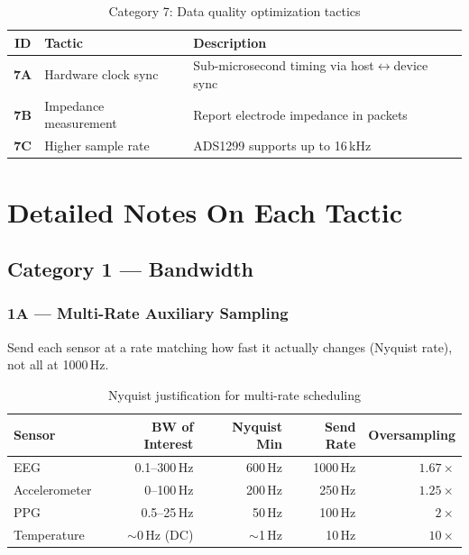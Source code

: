 \documentclass[11pt,a4paper]{article}
\newcommand{\tactic}[1]{\textbf{#1}}
\begin{document}
\begin{table}[H]
\centering
\small
\begin{tabularx}{\textwidth}{|c|l|X|}
\hline
\textbf{ID} & \textbf{Tactic} & \textbf{Description} \\\hline
\tactic{7A} & Hardware clock sync & Sub-microsecond timing via host$\leftrightarrow$device sync \\
\tactic{7B} & Impedance measurement & Report electrode impedance in packets \\
\tactic{7C} & Higher sample rate & ADS1299 supports up to 16\,kHz \\
\hline
\end{tabularx}
\caption{Category 7: Data quality optimization tactics}
\end{table}

\section{Detailed Notes On Each Tactic}
\label{sec:tactic-details}

\subsection{Category 1 --- Bandwidth}

\subsubsection{1A --- Multi-Rate Auxiliary Sampling}

Send each sensor at a rate matching how fast it actually changes (Nyquist rate), not all at 1000\,Hz.

\begin{table}[H]
\centering
\begin{tabular}{|l|r|r|r|r|}
\hline
\textbf{Sensor} & \textbf{BW of Interest} & \textbf{Nyquist Min} & \textbf{Send Rate} & \textbf{Oversampling} \\\hline
\hline
EEG & 0.1--300\,Hz & 600\,Hz & 1000\,Hz & $1.67\times$ \\
Accelerometer & 0--100\,Hz & 200\,Hz & 250\,Hz & $1.25\times$ \\
PPG & 0.5--25\,Hz & 50\,Hz & 100\,Hz & $2\times$ \\
Temperature & ${\sim}$0\,Hz (DC) & ${\sim}$1\,Hz & 10\,Hz & $10\times$ \\
\hline
\end{tabular}
\caption{Nyquist justification for multi-rate scheduling}
\end{table}
\end{document}
